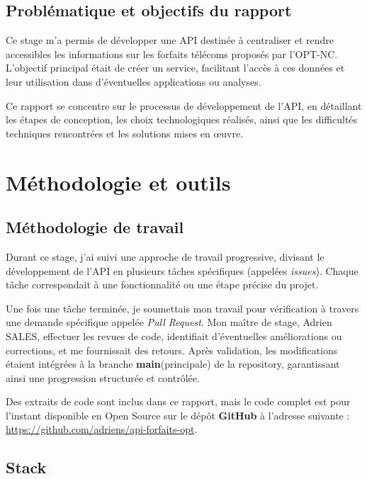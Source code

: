 \documentclass[11pt]{article}
\begin{document}
		\subsection{Problématique et objectifs du rapport}
		
		Ce stage m’a permis de développer une API destinée à centraliser et rendre accessibles les informations sur les forfaits télécoms proposés par l’OPT-NC. L’objectif principal était de créer un service, facilitant l’accès à ces données et leur utilisation dans d’éventuelles applications ou analyses.
		
		Ce rapport se concentre sur le processus de développement de l’API, en détaillant les étapes de conception, les choix technologiques réalisés, ainsi que les difficultés techniques rencontrées et les solutions mises en œuvre.
		
		\newpage
		\section{Méthodologie et outils}
		
		\subsection{Méthodologie de travail}
		
		Durant ce stage, j'ai suivi une approche de travail progressive, divisant le développement de l'API en plusieurs tâches spécifiques (appelées \textit{issues}). Chaque tâche correspondait à une fonctionnalité ou une étape précise du projet.
		
		Une fois une tâche terminée, je soumettais mon travail pour vérification à travers une demande spécifique appelée \textit{Pull Request}. Mon maître de stage, Adrien SALES, effectuer les revues de code, identifiait d'éventuelles améliorations ou corrections, et me fournissait des retours. Après validation, les modifications étaient intégrées à la branche \textbf{main}(principale) de la repository, garantissant ainsi une progression structurée et contrôlée.
		
		Des extraits de code sont inclus dans ce rapport, mais le code complet est pour l'instant disponible en Open Source sur le dépôt \textbf{GitHub} à l'adresse suivante : \url{https://github.com/adriens/api-forfaits-opt}.
		
		\subsection{Stack}
		
\end{document}
